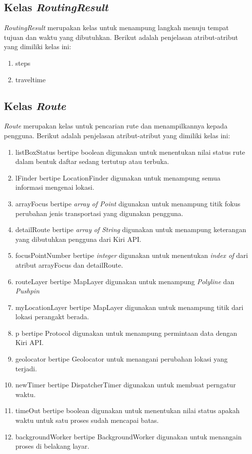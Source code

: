 \subsection{Kelas \textit{RoutingResult}}
\label{lab:Kelas RoutingResult}
\hspace{0.5cm} \textit{RoutingResult} merupakan kelas untuk menampung langkah menuju tempat tujuan dan waktu yang dibutuhkan. Berikut adalah penjelasan atribut-atribut yang dimiliki kelas ini:
\begin{enumerate}
	\item steps
	\item traveltime
\end{enumerate}

\subsection{Kelas \textit{Route}}
\label{lab:Kelas Route}
\hspace{0.5cm} \textit{Route} merupakan kelas untuk pencarian rute dan menampilkannya kepada pengguna. Berikut adalah penjelasan atribut-atribut yang dimiliki kelas ini:
\begin{enumerate}
	\item listBoxStatus bertipe boolean digunakan untuk menentukan nilai status rute dalam bentuk daftar sedang tertutup atau terbuka. 
	\item lFinder bertipe LocationFinder digunakan untuk menampung semua informasi mengenai lokasi.
	\item arrayFocus bertipe \textit{array of Point} digunakan untuk menampung titik fokus perubahan jenis transportasi yang digunakan pengguna.  
	\item detailRoute bertipe \textit{array of String} digunakan untuk menampung keterangan yang dibutuhkan pengguna dari Kiri API.
	\item focusPointNumber bertipe \textit{integer} digunakan untuk menentukan \textit{index of} dari atribut arrayFocus dan detailRoute.
	\item routeLayer bertipe MapLayer digunakan untuk menampung \textit{Polyline} dan \textit{Pushpin}
	\item myLocationLayer bertipe MapLayer digunakan untuk menampung titik dari lokasi perangakt berada.
	\item p bertipe Protocol digunakan untuk menampung permintaan data dengan Kiri API.
	\item geolocator bertipe Geolocator untuk menangani perubahan lokasi yang terjadi.
	\item newTimer bertipe DispatcherTimer digunakan untuk membuat perngatur waktu.
	\item timeOut bertipe boolean digunakan untuk menentukan nilai status apakah waktu untuk satu proses sudah mencapai batas.
	\item backgroundWorker bertipe BackgroundWorker digunakan untuk menangain proses di belakang layar.
\end{enumerate}

